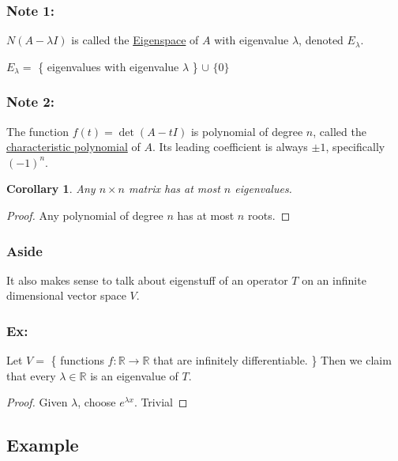 \documentclass{article}
\newtheorem{corollary}[theorem]{Corollary}
\newtheorem{one minute paper}[theorem]{One Minute Paper}
\begin{document}
\subsubsection*{Note 1:}

$N(A - \lambda I)$ is called the \underline{Eigenspace} of $A$ with eigenvalue $\lambda$, denoted $E_\lambda$. 
\begin{center}
    $E_\lambda = $ \{ eigenvalues with eigenvalue $\lambda$ \} $\cup$ $\{ 0 \}$
\end{center} 

\subsubsection*{Note 2:}

The function $f(t) = \det(A - tI)$ is polynomial of degree $n$, called the \underline{characteristic polynomial} of $A$. Its leading 
coefficient is always $\pm 1$, specifically $(-1)^n$. 

\begin{corollary}
    Any $n \times n$ matrix has at most $n$ eigenvalues.
\end{corollary}

\begin{proof}
    Any polynomial of degree $n$ has at most $n$ roots. 
\end{proof}

\subsubsection*{Aside}

It also makes sense to talk about eigenstuff of an operator $T$ on an infinite dimensional vector space $V$. 

\subsubsection*{Ex:}

Let $V = $ \{ functions $f: \mathbb{R} \rightarrow \mathbb{R}$ that are infinitely differentiable. \} Then we claim that every $\lambda \in \mathbb{R}$ is an eigenvalue of $T$.

\begin{proof}
    Given $\lambda$, choose $e^{\lambda x}$. Trivial
\end{proof}

\subsection*{Example}
\end{document}
